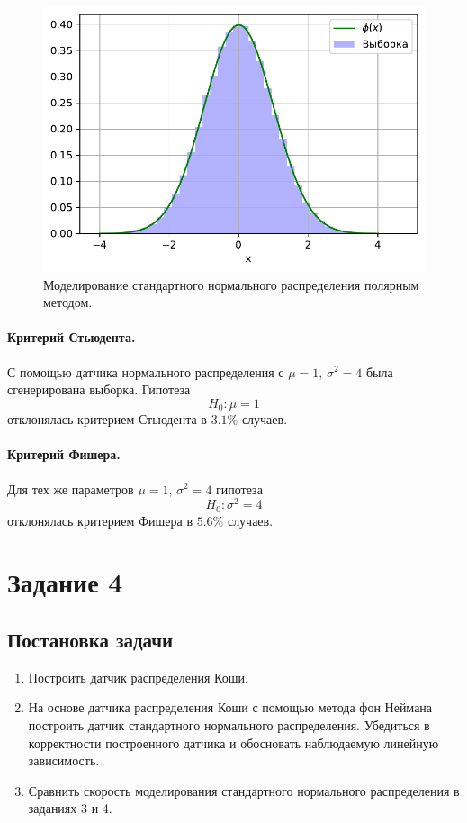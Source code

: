 \documentclass[16pt]{article}
\begin{document}
\begin{figure}[h]
	\center
	\includegraphics[scale=0.7]{3_4.pdf}
	\caption{Моделирование стандартного нормального распределения полярным методом.}
\end{figure}

\paragraph{Критерий Стьюдента.} С помощью датчика нормального распределения с $\mu = 1,\, \sigma^2 = 4$ была сгенерирована выборка. Гипотеза
$$H_0: \mu = 1$$
отклонялась критерием Стьюдента в $3.1\%$ случаев.

\paragraph{Критерий Фишера.} Для тех же параметров $\mu = 1,\, \sigma^2 = 4$ гипотеза
$$H_0: \sigma^2 = 4$$
отклонялась критерием Фишера в $5.6\%$ случаев.



\newpage
\section{Задание 4}
\subsection{Постановка задачи}
\begin{enumerate}
\item Построить датчик распределения Коши.
\item На основе датчика распределения Коши с помощью метода фон Неймана построить датчик стандартного нормального распределения. Убедиться в корректности построенного датчика и обосновать наблюдаемую линейную зависимость.
\item Сравнить скорость моделирования стандартного нормального распределения в заданиях 3 и 4.
\end{enumerate}
\end{document}

